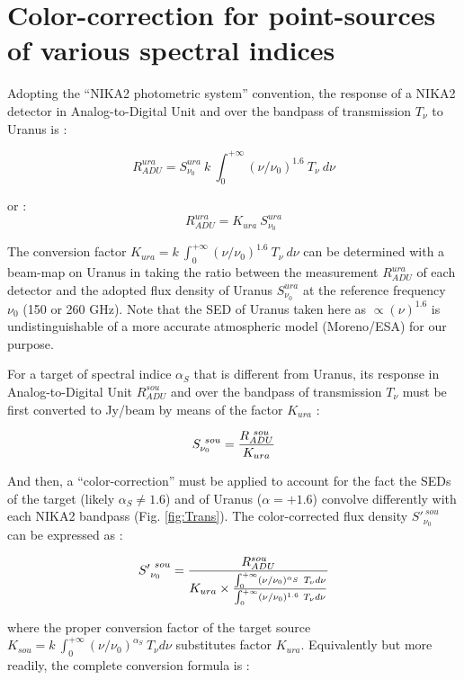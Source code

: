 \documentclass[a4paper, 11pt]{report}
\begin{document}
\section{Color-correction for point-sources of various spectral indices}


Adopting  the ``NIKA2 photometric system'' convention, the response of a NIKA2 detector in Analog-to-Digital Unit and over the bandpass 
of transmission $T_{\nu}$ to Uranus is :

$$ R_{ADU}^{ura} =  S_{\nu_0}^{ura}~ k~\int_{0}^{+\infty} (\nu /\nu_0)^{1.6} ~ T_{\nu} ~ d\nu  $$

\null

\noindent or : $$ R_{ADU}^{ura} = K_{ura}  ~ S_{\nu_0}^{ura} $$

\null

\noindent The conversion factor   $K_{ura}  = k ~
\int_{0}^{+\infty} (\nu /\nu_0)^{1.6} ~ T_{\nu} ~ d\nu $ can be
determined with a beam-map on Uranus in taking the ratio between the measurement $R_{ADU}^{ura}$ of each detector and 
the adopted flux density of Uranus $S_{\nu_0}^{ura}$ at the reference frequency $\nu_0$ (150 or 260 GHz).
Note that the SED of Uranus taken here as $\propto (\nu)^{1.6}$  is undistinguishable of a more
accurate atmospheric model  (Moreno/ESA) for our purpose.


For a target of spectral indice  $\alpha_{S}$ that is different from Uranus,  
its  response in Analog-to-Digital Unit $R_{ADU}^{sou}$    and over the bandpass
of transmission $T_{\nu}$ must be first converted to Jy/beam by means of the factor $K_{ura}$ :

$$ S_{\nu_0}^{~sou} =  {R_{ADU}^{~ sou} \over K_{ura}} $$

\noindent And then, a ``color-correction'' must be applied to account for the fact the SEDs of the target (likely $\alpha_{S} \ne 1.6$) 
and of Uranus ($\alpha=+1.6$) convolve differently with
each NIKA2 bandpass (Fig. \ref{fig:Trans}). The color-corrected flux density ${S'}_{\nu_0}^{~sou}$ can be expressed as :

$$ {S'}_{\nu_0}^{~sou} =  {R_{ADU}^{sou} \over { K_{ura} \times {{{\int_{0}^{+\infty} (\nu /\nu_0)^{\alpha_{S}} ~ T_{\nu} d\nu }  } \over { \int_{0}^{+\infty} (\nu /\nu_0)^{1.6} ~ T_{\nu} d\nu  }}}}  $$


\noindent where the proper conversion factor of the target source 
$K_{sou}=k ~ \int_{0}^{+\infty} (\nu /\nu_0)^{\alpha_S} ~ T_{\nu} d\nu $ substitutes factor $K_{ura}$.  Equivalently but more readily, the complete conversion formula is  :
\end{document}
